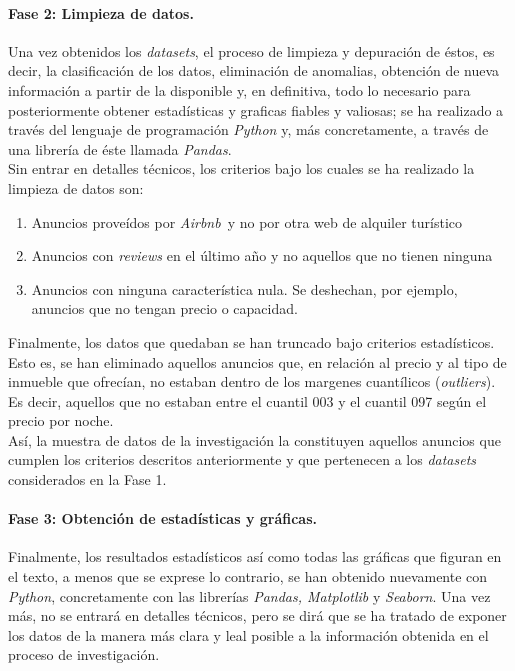 \documentclass[a4paper,10pt]{article}
\newcommand*{\airbnb}{\textit{Airbnb}}
\begin{document}
\begin{multicols}{2}
            \paragraph*{\textbf{Fase 2: Limpieza de datos.}}
            Una vez obtenidos los \textit{datasets}, el proceso de limpieza y depuración de éstos, es decir, la clasificación de los datos, eliminación de 
            anomalias, obtención de nueva información a partir de la disponible y, en definitiva, todo lo necesario para posteriormente obtener estadísticas 
            y graficas fiables y valiosas; se ha realizado a través del lenguaje de programación \emph{Python} y, más concretamente, a través de una librería 
            de éste llamada \emph{Pandas}. \\
            Sin entrar en detalles técnicos, los criterios bajo los cuales se ha realizado la limpieza de datos son:

            \begin{enumerate}
                \item Anuncios proveídos por \airbnb \ y no por otra web de alquiler turístico
                \item Anuncios con \textit{reviews} en el último año y no aquellos que no tienen ninguna
                \item Anuncios con ninguna característica nula. Se deshechan, por ejemplo, anuncios que no tengan precio o capacidad.  
            \end{enumerate}

            \noindent
            Finalmente, los datos que quedaban se han truncado bajo criterios estadísticos. Esto es, se han eliminado aquellos anuncios que, en relación al
            precio y al tipo de inmueble que ofrecían, no estaban dentro de los margenes cuantílicos (\textit{outliers}). Es decir, aquellos que no estaban entre
            el cuantil 003 y el cuantil 097 según el precio por noche. \\

            \noindent
            Así, la muestra de datos de la investigación la constituyen aquellos anuncios que cumplen los criterios descritos anteriormente y que 
            pertenecen a los \textit{datasets} considerados en la Fase 1.

            \clearpage
            \paragraph*{\textbf{Fase 3: Obtención de estadísticas y gráficas.}}
            Finalmente, los resultados estadísticos así como todas las gráficas que figuran en 
            el texto, a menos que se exprese lo contrario, se han obtenido nuevamente con \emph{Python}, concretamente con las librerías \emph{Pandas, 
            Matplotlib} y \emph{Seaborn}. Una vez más, no se entrará en detalles técnicos, pero se dirá que se ha tratado de exponer los datos de la manera más 
            clara y leal posible a la información obtenida en el proceso de investigación. \\


\end{multicols}
\end{document}
